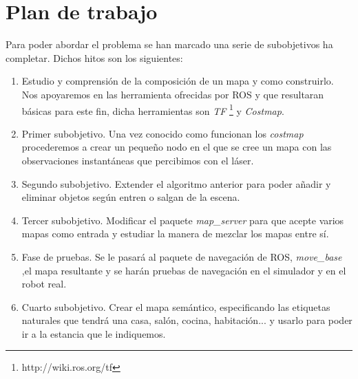 \section{Plan de trabajo}
\label{sec:plandetrabajo}

Para poder abordar el problema se han marcado una serie de subobjetivos ha completar. Dichos hitos son los siguientes:

\begin{enumerate}
\item Estudio y comprensión de la composición de un mapa y como construirlo. Nos apoyaremos en las herramienta ofrecidas por ROS y que resultaran básicas para este fin, dicha herramientas son \textit{TF} \footnote{http://wiki.ros.org/tf} y \textit{Costmap}\footnotemark .
\item Primer subobjetivo. Una vez conocido como funcionan los \textit{costmap} procederemos a crear un pequeño nodo en el que se cree un mapa con las observaciones instantáneas que percibimos con el láser.
\item Segundo subobjetivo. Extender el algoritmo anterior para poder añadir y eliminar objetos según entren o salgan de la escena.
\item Tercer subobjetivo. Modificar el paquete \textit{map\_server} para que acepte varios mapas como entrada y estudiar la manera de mezclar los mapas entre sí.
\item Fase de pruebas. Se le pasará al paquete de navegación de ROS, \textit{move\_base} ,el mapa resultante y se harán pruebas de navegación en el simulador y en el robot real.
\item Cuarto subobjetivo. Crear el mapa semántico, especificando las etiquetas naturales que tendrá una casa, salón, cocina, habitación... y usarlo para poder ir a la estancia que le indiquemos.

\end{enumerate}

